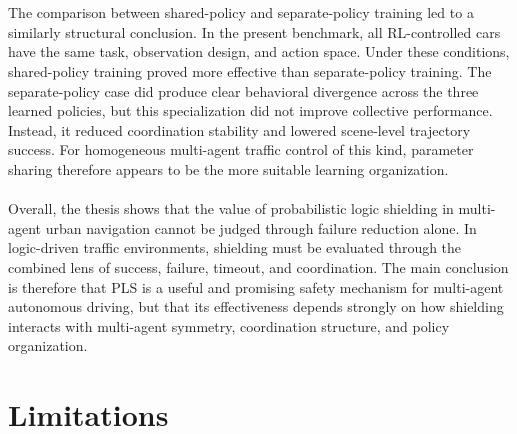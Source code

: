 \\
\\
The comparison between shared-policy and separate-policy training led to a similarly structural conclusion. In the present benchmark, all RL-controlled cars have the same task, observation design, and action space. Under these conditions, shared-policy training proved more effective than separate-policy training. The separate-policy case did produce clear behavioral divergence across the three learned policies, but this specialization did not improve collective performance. Instead, it reduced coordination stability and lowered scene-level trajectory success. For homogeneous multi-agent traffic control of this kind, parameter sharing therefore appears to be the more suitable learning organization.
\\
\\
Overall, the thesis shows that the value of probabilistic logic shielding in multi-agent urban navigation cannot be judged through failure reduction alone. In logic-driven traffic environments, shielding must be evaluated through the combined lens of success, failure, timeout, and coordination. The main conclusion is therefore that PLS is a useful and promising safety mechanism for multi-agent autonomous driving, but that its effectiveness depends strongly on how shielding interacts with multi-agent symmetry, coordination structure, and policy organization.

\section{Limitations}

